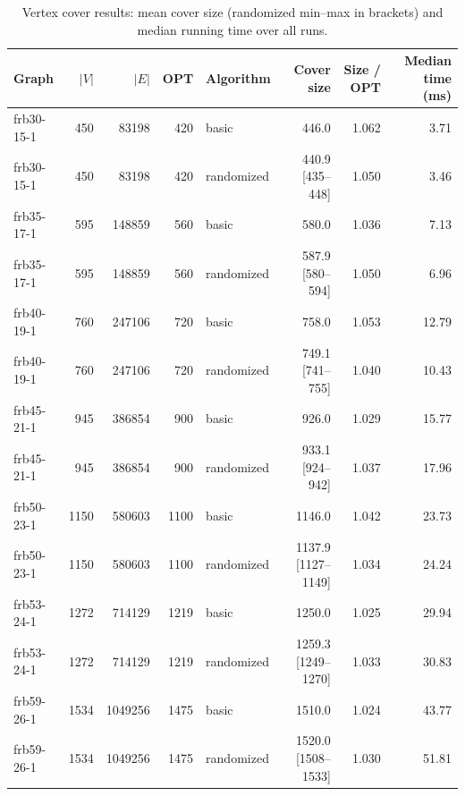 \begin{table}[t]
  \caption{Vertex cover results: mean cover size (randomized min--max in brackets) and median running time over all runs.}
  \label{tab:vertex-cover}
  \small
  \begin{tabular}{lrrrlrrr}
    \toprule
    Graph & $|V|$ & $|E|$ & OPT & Algorithm & Cover size & Size / OPT & Median time (ms) \\
    \midrule
    frb30-15-1 & 450 & 83198 & 420 & basic & 446.0 & 1.062 & 3.71 \\
    frb30-15-1 & 450 & 83198 & 420 & randomized & 440.9 [435--448] & 1.050 & 3.46 \\
    frb35-17-1 & 595 & 148859 & 560 & basic & 580.0 & 1.036 & 7.13 \\
    frb35-17-1 & 595 & 148859 & 560 & randomized & 587.9 [580--594] & 1.050 & 6.96 \\
    frb40-19-1 & 760 & 247106 & 720 & basic & 758.0 & 1.053 & 12.79 \\
    frb40-19-1 & 760 & 247106 & 720 & randomized & 749.1 [741--755] & 1.040 & 10.43 \\
    frb45-21-1 & 945 & 386854 & 900 & basic & 926.0 & 1.029 & 15.77 \\
    frb45-21-1 & 945 & 386854 & 900 & randomized & 933.1 [924--942] & 1.037 & 17.96 \\
    frb50-23-1 & 1150 & 580603 & 1100 & basic & 1146.0 & 1.042 & 23.73 \\
    frb50-23-1 & 1150 & 580603 & 1100 & randomized & 1137.9 [1127--1149] & 1.034 & 24.24 \\
    frb53-24-1 & 1272 & 714129 & 1219 & basic & 1250.0 & 1.025 & 29.94 \\
    frb53-24-1 & 1272 & 714129 & 1219 & randomized & 1259.3 [1249--1270] & 1.033 & 30.83 \\
    frb59-26-1 & 1534 & 1049256 & 1475 & basic & 1510.0 & 1.024 & 43.77 \\
    frb59-26-1 & 1534 & 1049256 & 1475 & randomized & 1520.0 [1508--1533] & 1.030 & 51.81 \\
    \bottomrule
  \end{tabular}
\end{table}
